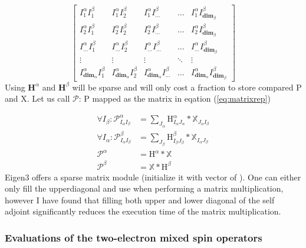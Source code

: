 \begin{equation}
\begin{bmatrix} \label{eq:matrixrep}
    I^{\alpha}_1 I^{\beta}_1 & I^{\alpha}_1 I^{\beta}_2  & I^{\alpha}_1 I^{\beta}_{...} & \dots  & I^{\alpha}_1 I^{\beta}_{\textbf{dim}_\beta} \\
    I^{\alpha}_2 I^{\beta}_1 & I^{\alpha}_2 I^{\beta}_2  & I^{\alpha}_2 I^{\beta}_{...} & \dots  & I^{\alpha}_2 I^{\beta}_{\textbf{dim}_\beta} \\
    I^{\alpha}_{...} I^{\beta}_1 & I^{\alpha}_{...} I^{\beta}_2  & I^{\alpha}_{...} I^{\beta}_{...} & \dots  & I^{\alpha}_{...} I^{\beta}_{\textbf{dim}_\beta} \\
    \vdots & \vdots & \vdots & \ddots & \vdots \\
    I^{\alpha}_{\textbf{dim}_\alpha} I^{\beta}_1 & I^{\alpha}_{\textbf{dim}_\alpha} I^{\beta}_2  & I^{\alpha}_{\textbf{dim}_\alpha} I^{\beta}_{...} & \dots  &
    I^{\alpha}_{\textbf{dim}_\alpha} I^{\beta}_{\textbf{dim}_\beta}
\end{bmatrix}
\end{equation}
Using $\textbf{H}^{\alpha}$ and $\textbf{H}^{\beta}$ will be sparse and will only cost a fraction to store compared P and X.
Let us call $\mathcal{P}$: P mapped as the matrix in eqation (\ref{eq:matrixrep})

\begin{align}
    \forall I_\beta: \mathcal{P}^{\alpha}_{I_\alpha I_\beta} & = \sum_{J_\alpha} \text{H}^{\alpha}_{I_\alpha J_\alpha} * \mathbb{X}_{J_\alpha I_\beta} \\
    \forall I_\alpha: \mathcal{P}^{\beta}_{I_\alpha  I_\beta} & = \sum_{J_\beta} \text{H}^{\beta}_{I_\beta J_\beta} * \mathbb{X}_{I_\alpha J_\beta} \\
   \mathcal{P}^\alpha & = \text{H}^{\alpha} * \mathbb{X} \\
  \mathcal{P}^\beta & = \mathbb{X} * \text{H}^{\beta}
\end{align}
Eigen3 offers a sparse matrix module (initialize it with vector of ). One can either only fill the upperdiagonal and use 
when performing a matrix multiplication, however I have found that filling both upper and lower diagonal of the self adjoint  significantly reduces the execution time of the matrix multiplication.

\subsubsection{Evaluations of the two-electron mixed spin operators}

